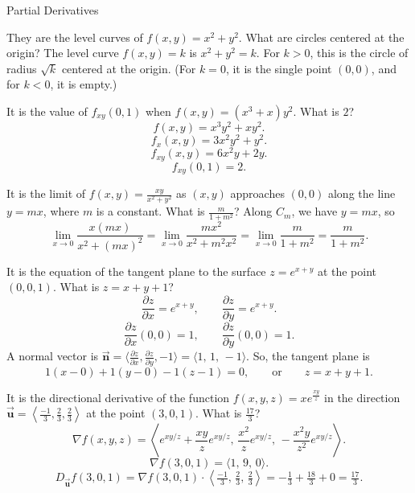 \documentclass{article}
\newcommand{\bvec}[1]{\vec{\mathbf{#1}}}
\newcommand{\dotprod}{\cdot}
\begin{document}
\begin{category}{Partial Derivatives}

  \begin{clue}[say]
    They are the level curves of $f(x,y)=x^2+y^2$.
  \response
    What are circles centered at the origin?
  \solution
    The level curve $f(x,y)=k$ is $x^2+y^2=k$. For $k>0$, this is the circle of radius $\sqrt{k}$ centered at the origin. (For $k=0$, it is the single point $(0,0)$, and for $k<0$, it is empty.)
  \end{clue}

  \begin{clue}[say]
    It is the value of $f_{xy}(0,1)$ when $\displaystyle f(x,y) = (x^3 + x)y^2$.
  \response
    What is $2$?
  \solution
    \[
    f(x,y)=x^3y^2+xy^2.
    \]
    \[
    f_x(x,y)=3x^2y^2+y^2.
    \]
    \[
    f_{xy}(x,y)=6x^2y+2y.
    \]
    \[
    f_{xy}(0,1)=2.
    \]
  \end{clue}

  \begin{clue}[write]
    It is the limit of $\displaystyle f(x,y) = \frac{xy}{x^2 + y^2}$ as $(x,y)$ approaches $(0,0)$ along the line $y = mx$, where $m$ is a constant.
  \response
    What is $\displaystyle \frac{m}{1+m^2}$?
  \solution
    Along $C_m$, we have $y=mx$, so
    \[
    \lim_{x\to 0}\frac{x(mx)}{x^2+(mx)^2}
    =\lim_{x\to 0}\frac{mx^2}{x^2+m^2x^2}
    =\lim_{x\to 0}\frac{m}{1+m^2}
    =\frac{m}{1+m^2}.
    \]
  \end{clue}

  \begin{clue}[write]
    It is the equation of the tangent plane to the surface $z = e^{x+y}$ at the point $(0,0,1)$.
  \response
    What is $z=x+y+1$?
  \solution
    \[
    \frac{\partial z}{\partial x}=e^{x+y},\qquad \frac{\partial z}{\partial y}=e^{x+y}.
    \]
    \[
    \frac{\partial z}{\partial x}(0,0)=1,\qquad \frac{\partial z}{\partial y}(0,0)=1.
    \]
    A normal vector is $\bvec{n}=\langle \tfrac{\partial z}{\partial x}, \tfrac{\partial z}{\partial y}, -1\rangle=\langle 1,\,1,\,-1\rangle$. So, the tangent plane is
    \[
    1(x-0)+1(y-0)-1(z-1)=0,\qquad\text{or}\qquad z=x+y+1.
    \]
  \end{clue}

  \begin{clue}[say]
    It is the directional derivative of the function $\displaystyle f(x,y,z) = xe^{\frac{xy}{z}}$ in the direction $\bvec{u} = \left\langle\frac{-1}{3}, \frac{2}{3}, \frac{2}{3}\right\rangle$ at the point $(3,0,1)$.
  \response
    What is $\frac{17}{3}$?
  \solution
    \[
    \nabla f(x,y,z)=\left\langle e^{xy/z}+\frac{xy}{z}e^{xy/z},\,\frac{x^2}{z}e^{xy/z},\,-\frac{x^2y}{z^2}e^{xy/z}\right\rangle.
    \]
    \[
    \nabla f(3,0,1)=\langle 1,\,9,\,0\rangle.
    \]
    \[
    D_{\bvec{u}}f(3,0,1)=\nabla f(3,0,1)\dotprod\left\langle\tfrac{-1}{3},\,\tfrac{2}{3},\,\tfrac{2}{3}\right\rangle
    =-\tfrac{1}{3}+\tfrac{18}{3}+0=\tfrac{17}{3}.
    \]
  \end{clue}

\end{category}
\end{document}
